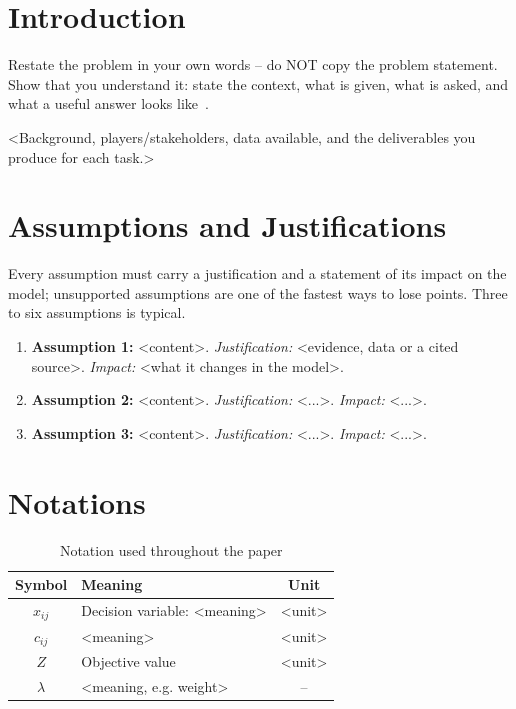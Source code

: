 \documentclass[12pt]{article}
\begin{document}
\section{Introduction}
Restate the problem in your own words -- do NOT copy the problem statement.
Show that you understand it: state the context, what is given, what is asked,
and what a useful answer looks like~\cite{giordano2014mathematical}.

<Background, players/stakeholders, data available, and the deliverables you
produce for each task.>

\section{Assumptions and Justifications}
Every assumption must carry a justification and a statement of its impact on
the model; unsupported assumptions are one of the fastest ways to lose
points. Three to six assumptions is typical.

\begin{enumerate}
  \item \textbf{Assumption 1:} <content>.
        \emph{Justification:} <evidence, data or a cited source>.
        \emph{Impact:} <what it changes in the model>.
  \item \textbf{Assumption 2:} <content>.
        \emph{Justification:} <...>. \emph{Impact:} <...>.
  \item \textbf{Assumption 3:} <content>.
        \emph{Justification:} <...>. \emph{Impact:} <...>.
\end{enumerate}

\section{Notations}
\begin{table}[htbp]
  \centering
  \caption{Notation used throughout the paper}
  \label{tab:notation}
  \begin{tabular}{clc}
    \toprule
    Symbol & Meaning & Unit \\
    \midrule
    $x_{ij}$ & Decision variable: <meaning> & <unit> \\
    $c_{ij}$ & <meaning>                  & <unit> \\
    $Z$      & Objective value            & <unit> \\
    $\lambda$& <meaning, e.g. weight>     & --     \\
    \bottomrule
  \end{tabular}
\end{table}
\end{document}
